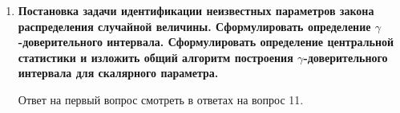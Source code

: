 \documentclass[12pt]{report}
\begin{document}
\begin{enumerate}
\begin{figure}[!h]
	\end{figure}

	\clearpage
	
	\item \textbf{Постановка задачи идентификации неизвестных параметров закона распределения случайной величины. Сформулировать определение $\gamma$-доверительного интервала. Сформулировать
		определение центральной статистики и изложить общий алгоритм построения $\gamma$-доверительного интервала для скалярного параметра.}
	
	Ответ на первый вопрос смотреть в ответах на вопрос 11.
	

\end{enumerate}
\end{document}
